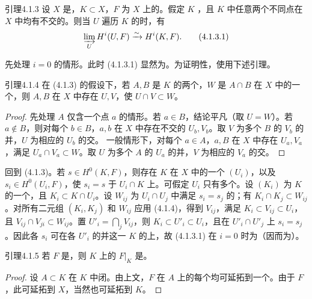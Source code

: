 \begin{SGAresult}{引理}{4.1.3}
设 $X$ 是，$K\subset X$，$F$ 为 $X$ 上的。假定 $K$ ，且 $K$ 中任意两个不同点在 $X$ 中均有不交的。则当 $U$ 遍历 $K$ 的时，有
\[
\varinjlim_U H^i(U,F)\xrightarrow{\sim}H^i(K,F). \tag{4.1.3.1}
\]
\end{SGAresult}
先处理 $i=0$ 的情形。此时 (4.1.3.1) 显然为。为证明性，使用下述引理。
\begin{SGAresult}{引理}{4.1.4}
在 (4.1.3) 的假设下，若 $A,B$ 是 $K$ 的两个，$W$ 是 $A\cap B$ 在 $X$ 中的一个，则 $A,B$ 在 $X$ 中存在 $U,V$，使 $U\cap V\subset W$。
\end{SGAresult}
\begin{proof}
先处理 $A$ 仅含一个点 $a$ 的情形。若 $a\in B$，结论平凡（取 $U=W$）。若 $a\notin B$，则对每个 $b\in B$，$a,b$ 在 $X$ 中存在不交的 $U_b,V_b$。取 $V$ 为多个 $B$ 的 $V_b$ 的并，$U$ 为相应的 $U_b$ 的交。
一般情形下，对每个 $a\in A$，$a,B$ 在 $X$ 中存在 $U_a,V_a$，满足 $U_a\cap V_a\subset W$。取 $U$ 为多个 $A$ 的 $U_a$ 的并，$V$ 为相应的 $V_a$ 的交。
\end{proof}
回到 (4.1.3)。若 $s\in H^0(K,F)$，则存在 $K$ 在 $X$ 中的一个 $(U_i)$，以及 $s_i\in H^0(U_i,F)$，使 $s_i=s$ 于 $U_i\cap K$ 上。可假定 $U_i$ 只有多个。设 $(K_i)$ 为 $K$ 的一个，且 $K_i\subset K\cap U_i$。设 $W_{ij}$ 为 $U_i\cap U_j$ 中满足 $s_i=s_j$ 的；有 $K_i\cap K_j\subset W_{ij}$。对所有二元组 $(K_i,K_j)$ 和 $W_{ij}$ 应用 (4.1.4)，得到 $V_{ij}$，满足 $K_i\subset V_{ij}\subset U_i$，且 $V_{ij}\cap V_{ji}\subset W_{ij}$。置 $U'_i=\bigcap_jV_{ij}$，则 $K_i\subset U'_i\subset U_i$，且在 $U'_i\cap U'_j$ 上 $s_i=s_j$。因此各 $s_i$ 可在各 $U'_i$ 的并这一 $K$ 的上，故 (4.1.3.1) 在 $i=0$ 时为（因而为）。
\begin{SGAresult}{引理}{4.1.5}
若 $F$ 是，则 $K$ 上的 $F|_K$ 是。
\end{SGAresult}
\begin{proof}
设 $A\subset K$ 在 $K$ 中闭。由上文，$F$ 在 $A$ 上的每个均可延拓到一个。由于 $F$ ，此可延拓到 $X$，当然也可延拓到 $K$。
\end{proof}
